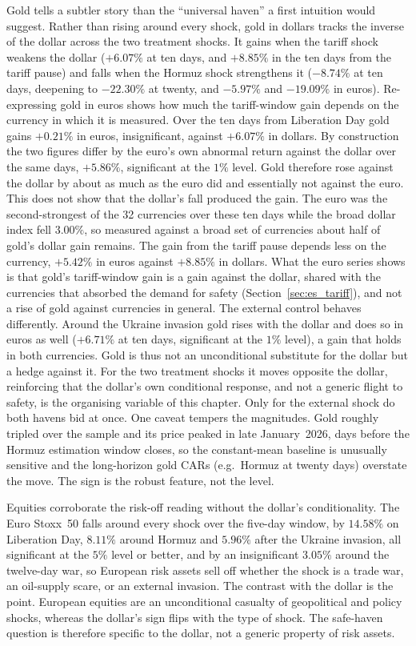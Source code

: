 Gold tells a subtler story than the ``universal haven'' a first intuition would suggest.
Rather than rising around every shock, gold in dollars tracks the inverse of the dollar across the two treatment shocks. It gains when the tariff shock weakens the dollar ($+6.07\%$ at ten days, and $+8.85\%$ in the ten days from the tariff pause) and falls when the Hormuz shock strengthens it ($-8.74\%$ at ten days, deepening to $-22.30\%$ at twenty, and $-5.97\%$ and $-19.09\%$ in euros). Re-expressing gold in euros shows how much the tariff-window gain depends on the currency in which it is measured. Over the ten days from Liberation Day gold gains $+0.21\%$ in euros, insignificant, against $+6.07\%$ in dollars. By construction the two figures differ by the euro's own abnormal return against the dollar over the same days, $+5.86\%$, significant at the $1\%$ level. Gold therefore rose against the dollar by about as much as the euro did and essentially not against the euro. This does not show that the dollar's fall produced the gain. The euro was the second-strongest of the 32 currencies over these ten days while the broad dollar index fell $3.00\%$, so measured against a broad set of currencies about half of gold's dollar gain remains. The gain from the tariff pause depends less on the currency, $+5.42\%$ in euros against $+8.85\%$ in dollars. What the euro series shows is that gold's tariff-window gain is a gain against the dollar, shared with the currencies that absorbed the demand for safety (Section~\ref{sec:es_tariff}), and not a rise of gold against currencies in general. The external control behaves differently. Around the Ukraine invasion gold rises with the dollar and does so in euros as well ($+6.71\%$ at ten days, significant at the $1\%$ level), a gain that holds in both currencies. Gold is thus not an
unconditional substitute for the dollar but a hedge against
it. For the two treatment shocks it moves opposite the dollar, reinforcing that the dollar's
own conditional response, and not a generic flight to safety, is the organising variable of
this chapter. Only for the external shock do both havens bid at once. One caveat tempers the
magnitudes. Gold roughly tripled over the sample and its price peaked in late January~2026,
days before the Hormuz estimation window closes, so the constant-mean baseline
is unusually sensitive and the long-horizon gold CARs (e.g.\ Hormuz at twenty days) overstate
the move. The sign is the robust feature, not the level.

Equities corroborate the risk-off reading without the dollar's conditionality. The Euro
Stoxx~50 falls around every shock over the five-day window, by $14.58\%$ on Liberation Day,
$8.11\%$ around Hormuz and $5.96\%$ after the Ukraine invasion, all significant at the $5\%$
level or better, and by an insignificant $3.05\%$ around the twelve-day war, so European
risk assets sell off whether the shock is a trade war, an oil-supply scare, or an external
invasion. The contrast with the dollar is the point. European equities are an unconditional casualty of geopolitical and policy shocks, whereas the dollar's sign flips with the type of
shock. The safe-haven question is therefore specific to the dollar, not a generic property
of risk assets.


